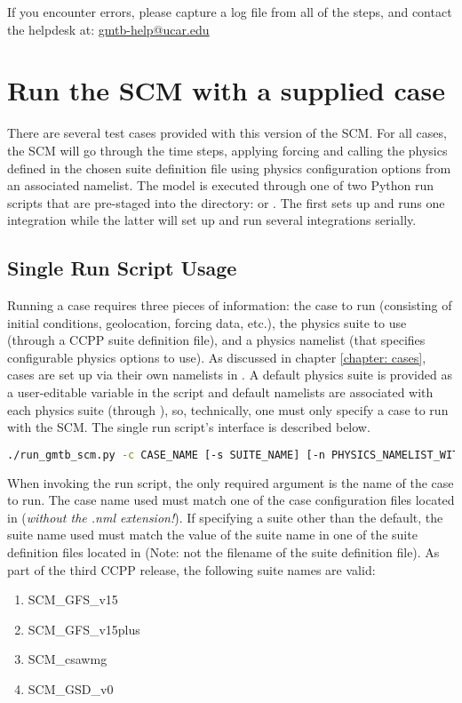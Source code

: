 If you encounter errors, please capture a log file from all of the steps, and contact the helpdesk at: \url{gmtb-help@ucar.edu}

\section{Run the SCM with a supplied case}
There are several test cases provided with this version of the SCM. For all cases, the SCM will go through the time steps, applying forcing and calling the physics defined in the chosen suite definition file using physics configuration options from an associated namelist. The model is executed through one of two Python run scripts that are pre-staged into the  directory:  or . The first sets up and runs one integration while the latter will set up and run several integrations serially. 

\subsection{Single Run Script Usage} \label{subsection: singlerunscript}
Running a case requires three pieces of information: the case to run (consisting of initial conditions, geolocation, forcing data, etc.), the physics suite to use (through a CCPP suite definition file), and a physics namelist (that specifies configurable physics options to use). As discussed in chapter \ref{chapter: cases}, cases are set up via their own namelists in . A default physics suite is provided as a user-editable variable in the script and default namelists are associated with each physics suite (through ), so, technically, one must only specify a case to run with the SCM. The single run script's interface is described below.

\begin{lstlisting}[language=bash]
./run_gmtb_scm.py -c CASE_NAME [-s SUITE_NAME] [-n PHYSICS_NAMELIST_WITH_PATH] [-g]
\end{lstlisting}

When invoking the run script, the only required argument is the name of the case to run. The case name used must match one of the case configuration files located in  (\emph{without the .nml extension!}). If specifying a suite other than the default, the suite name used must match the value of the suite name in one of the suite definition files located in  (Note: not the filename of the suite definition file). As part of the third CCPP release, the following suite names are valid:
\begin{enumerate}
\item SCM\_GFS\_v15
\item SCM\_GFS\_v15plus
\item SCM\_csawmg
\item SCM\_GSD\_v0
\end{enumerate}

